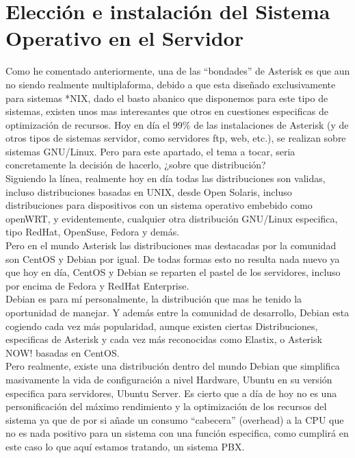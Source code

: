 \section{Elección e instalación del Sistema Operativo en el Servidor}

Como he comentado anteriormente, una de las “bondades” de Asterisk es que aun no siendo realmente multiplaforma, debido a que esta diseñado exclusivamente para sistemas *NIX, dado el basto abanico que disponemos para este tipo de sistemas, existen unos mas interesantes que otros en cuestiones especificas de optimización de recursos. Hoy en día el 99\% de las instalaciones de Asterisk (y de otros tipos de sistemas servidor, como servidores ftp, web, etc.), se realizan sobre sistemas GNU/Linux. Pero para este apartado, el tema a tocar, seria concretamente la decisión de hacerlo, ¿sobre que distribución?\\

Siguiendo la línea, realmente hoy en día todas las distribuciones son validas, incluso distribuciones basadas en UNIX, desde Open Solaris, incluso distribuciones para dispositivos con un sistema operativo embebido como openWRT, y evidentemente, cualquier otra distribución GNU/Linux especifica, tipo RedHat, OpenSuse, Fedora y demás.\\

Pero en el mundo Asterisk las distribuciones mas destacadas por la comunidad son CentOS y Debian por igual. De todas formas esto no resulta nada nuevo ya que hoy en día, CentOS y Debian se reparten el pastel de los servidores, incluso por encima de Fedora y RedHat Enterprise.\\

Debian es para mí personalmente, la distribución que mas he tenido la oportunidad de manejar. Y además entre la comunidad de desarrollo, Debian esta cogiendo cada vez más popularidad, aunque existen ciertas Distribuciones, especificas de Asterisk y cada vez más reconocidas como Elastix, o Asterisk NOW! basadas en CentOS. \\

Pero realmente, existe una distribución dentro del mundo Debian que simplifica masivamente la vida de configuración a nivel Hardware, Ubuntu en su versión especifica para servidores, Ubuntu Server. Es cierto que a día de hoy no es una personificación del máximo rendimiento y la optimización de los recursos del sistema ya que de por si añade un consumo “cabecera” (overhead) a la CPU que no es nada positivo para un sistema con una función especifica, como cumplirá en este caso lo que aquí estamos tratando, un sistema PBX.\\

